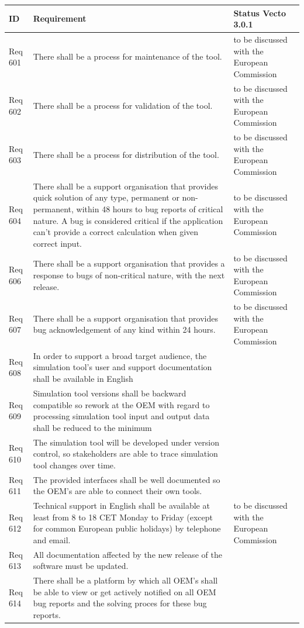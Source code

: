 \begin{tabular}{L{\IdColWidth}|L{\ReqColWidth}|M{\StatusColWidth}}
ID & Requirement & Status Vecto 3.0.1 \\ \hline\hline
Req 601 & There shall be a process for maintenance of the tool. & 
	to be discussed with the European Commission	 \\ \hline
Req 602 & There shall be a process for validation of the tool. & 
	to be discussed with the European Commission	 \\ \hline
Req 603 & There shall be a process for distribution of the tool. & 
	to be discussed with the European Commission	 \\ \hline
Req 604 & There shall be a support organisation that provides quick solution of any type, permanent or non-permanent, within 48 hours to bug reports of critical nature.  A bug is considered critical if the application can’t provide a correct calculation when given correct input. & 
	to be discussed with the European Commission	 \\ \hline
Req 606 & There shall be a support organisation that provides a response to bugs of non-critical nature, with the next release. & 
	to be discussed with the European Commission	 \\ \hline
Req 607 & There shall be a support organisation that provides bug acknowledgement of any kind within 24 hours. & 
	to be discussed with the European Commission	 \\ \hline
Req 608 & In order to support a broad target audience, the simulation tool's user and support documentation shall be available in English  & 
	\Vcheck	 \\ \hline
Req 609 & Simulation tool versions shall be backward compatible so rework at the OEM with regard to processing simulation tool input and output data shall be reduced to the minimum & 
	\Vcheck	 \\ \hline
Req 610 & The simulation tool will be developed under version control, so stakeholders are able to trace simulation tool changes over time. & 
	\Vcheck	 \\ \hline
Req 611 & The provided interfaces shall be well documented so the OEM's are able to connect their own tools. & 
	\Vtodo	 \\ \hline
Req 612 & Technical support in English shall be available at least from 8 to 18 CET Monday to Friday (except for common European public holidays) by telephone and email. & 
	to be discussed with the European Commission	 \\ \hline
Req 613 & All documentation affected by the new release of the software must be updated. & 
		 \\ \hline
Req 614 & There shall be a platform by which all OEM's shall be able to view or get actively notified on all OEM bug reports and the solving proces for these bug reports. & 
	\Vcheck	 \\ \hline
\end{tabular}

